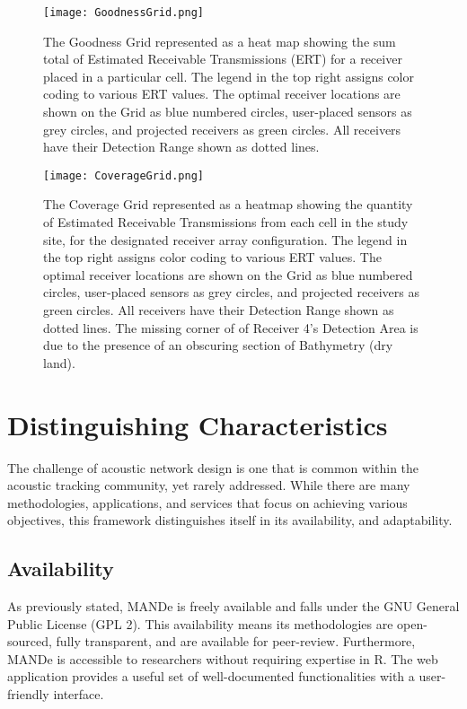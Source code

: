\begin{figure}[ht]
	\texttt{[image: GoodnessGrid.png]}
	\caption{The Goodness Grid represented as a heat map showing the sum total of Estimated Receivable Transmissions (ERT) for a receiver placed in a particular cell.  The legend in the top right assigns color coding to various ERT values. The optimal receiver locations are shown on the Grid as blue numbered circles, user-placed sensors as grey circles, and projected receivers as green circles.  All receivers have their Detection Range shown as dotted lines.\label{GoodnessGraph}} 
\end{figure}

\begin{figure}[ht]
	\texttt{[image: CoverageGrid.png]}
	\caption{The Coverage Grid represented as a heatmap showing the quantity of Estimated Receivable Transmissions from each cell in the study site, for the designated receiver array configuration.  The legend in the top right assigns color coding to various ERT values.  The optimal receiver locations are shown on the Grid as blue numbered circles, user-placed sensors as grey circles, and projected receivers as green circles.  All receivers have their Detection Range shown as dotted lines.  The missing corner of of Receiver 4's Detection Area is due to the presence of an obscuring section of Bathymetry (dry land).\label{coverageGraph}}
\end{figure}
	
\section{Distinguishing Characteristics}
The challenge of acoustic network design is one that is common within the acoustic tracking community, yet rarely addressed.  While there are many methodologies, applications, and services that focus on achieving various objectives, this framework distinguishes itself in its availability, and adaptability.  

\subsection{Availability}
As previously stated, MANDe is freely available \cite{acousitcdeploy} and falls under the GNU General Public License (GPL 2).  This availability means its methodologies are open-sourced, fully transparent, and are available for peer-review.  Furthermore, MANDe is accessible to researchers without requiring expertise in R.  The web application provides a useful set of well-documented functionalities with a user-friendly interface.

